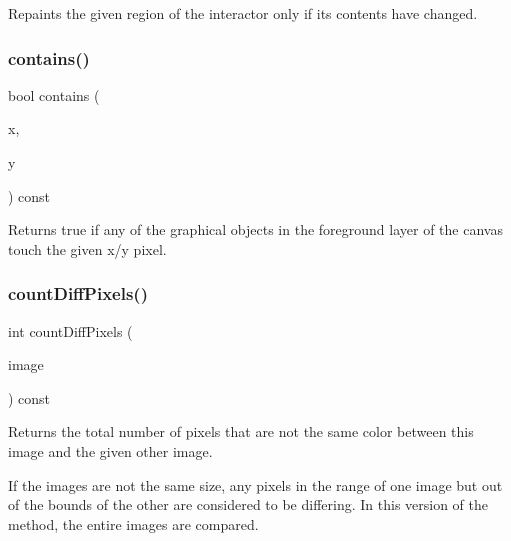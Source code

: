 Repaints the given region of the interactor only if its contents have changed. 

\mbox{\label{classsgl_1_1GCanvas_abb6a5d7c03e6eaaae97264c4799ce7c3}} 
\subsubsection{\texorpdfstring{contains()}{contains()}}
{\footnotesize\ttfamily bool contains (\begin{DoxyParamCaption}\item[{double}]{x,  }\item[{double}]{y }\end{DoxyParamCaption}) const\hspace{0.3cm}{\ttfamily [virtual]}}



Returns true if any of the graphical objects in the foreground layer of the canvas touch the given x/y pixel. 

\mbox{\label{classsgl_1_1GCanvas_ad3d6147a5e08ed97bb71c7f267ef071b}} 
\subsubsection{\texorpdfstring{count\+Diff\+Pixels()}{countDiffPixels()}\hspace{0.1cm}{\footnotesize\ttfamily [1/4]}}
{\footnotesize\ttfamily int count\+Diff\+Pixels (\begin{DoxyParamCaption}\item[{const \mbox{\hyperlink{classsgl_1_1GCanvas}{G\+Canvas}} \&}]{image }\end{DoxyParamCaption}) const\hspace{0.3cm}{\ttfamily [virtual]}}



Returns the total number of pixels that are not the same color between this image and the given other image. 

If the images are not the same size, any pixels in the range of one image but out of the bounds of the other are considered to be differing. In this version of the method, the entire images are compared. \mbox{\label{classsgl_1_1GCanvas_a3ed6edef8ed522bbfc09d8f6005d6d8e}} 
